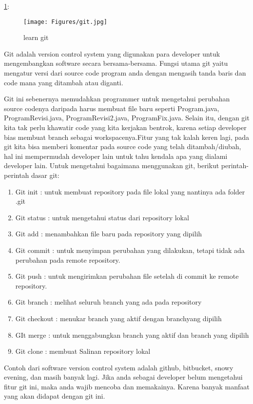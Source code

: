 \ref{git.jpg}:
\begin{figure}[ht]
	\centerline{\texttt{[image: Figures/git.jpg]}}
	\caption{learn git}
	\label{git.jpg}
\end{figure}

Git adalah version control system yang digunakan para developer untuk 
mengembangkan software secara bersama-bersama. Fungsi utama git yaitu 
mengatur versi dari source code program anda dengan mengasih tanda baris 
dan code mana yang ditambah atau diganti.
\vspace{12pt}

Git ini sebenernya memudahkan programmer untuk mengetahui perubahan 
source codenya daripada harus membuat file baru seperti Program.java, 
ProgramRevisi.java, ProgramRevisi2.java, ProgramFix.java. Selain itu, 
dengan git kita tak perlu khawatir code yang kita kerjakan bentrok, 
karena setiap developer bias membuat branch sebagai workspacenya.Fitur 
yang tak kalah keren lagi, pada git kita bisa memberi komentar pada 
source code yang telah ditambah/diubah, hal ini mempermudah developer 
lain untuk tahu kendala apa yang dialami developer lain.
\vspace{12pt}
Untuk mengetahui bagaimana menggunakan git, berikut perintah-perintah 
dasar git:

\begin{enumerate}
\item Git init : untuk membuat repository pada file lokal yang nantinya 
ada folder .git
\item Git status : untuk mengetahui status dari repository lokal
\item Git add : menambahkan file baru pada repository yang dipilih
\item Git commit : untuk menyimpan perubahan yang dilakukan, tetapi 
tidak ada perubahan pada remote repository.
\item Git push : untuk mengirimkan perubahan file setelah di commit ke 
remote repository.
\item Git branch : melihat seluruh branch yang ada pada repository
\item Git checkout : menukar branch yang aktif dengan branchyang dipilih
\item GIt merge : untuk menggabungkan branch yang aktif dan branch yang 
dipilih
\item Git clone : membuat Salinan repository lokal
\setcounter{numberedCntE}{\theenumi}
\end{enumerate}
Contoh dari software version control system adalah github, bitbucket, 
snowy evening, dan masih banyak lagi. Jika anda sebagai developer belum 
mengetahui fitur git ini, maka anda wajib mencoba dan memakainya. Karena 
banyak manfaat yang akan didapat dengan git ini.
\vspace{12pt}

